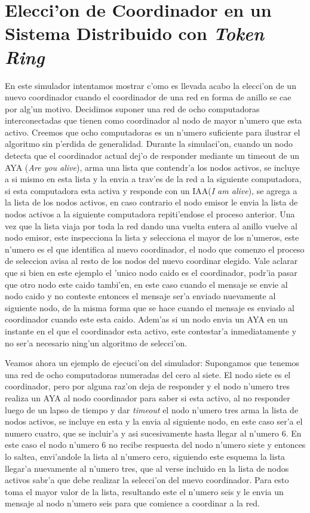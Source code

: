 \section{Elecci'on de Coordinador en un Sistema Distribuido con \emph{Token Ring}}
En este simulador intentamos mostrar c'omo es llevada acabo la elecci'on de un nuevo coordinador cuando el coordinador de una red en forma de anillo se cae por alg'un motivo.
Decidimos suponer una red de ocho computadoras interconectadas que tienen como coordinador al nodo de mayor n'umero que esta activo. Creemos que ocho computadoras es un n'umero suficiente para ilustrar el algoritmo sin p'erdida de generalidad.
Durante la simulaci'on, cuando un nodo detecta que el coordinador actual dej'o de responder mediante un timeout de un AYA (\emph{Are you alive}), arma una lista que contendr'a los nodos activos, se incluye a si mismo en esta lista y la envia a trav'es de la red a la siguiente computadora, si esta computadora esta activa y responde con un IAA(\emph{I am alive}), se agrega a la lista de los nodos activos, en caso contrario el nodo emisor le envia la lista de nodos activos a la siguiente computadora repiti'endose el proceso anterior. Una vez que la lista viaja por toda la red dando una vuelta entera al anillo vuelve al nodo emisor, este inspecciona la lista y selecciona el mayor de los n'umeros, este n'umero es el que identifica al nuevo coordinador, el nodo que comenzo el proceso de seleccion avisa al resto de los nodos del nuevo coordinar elegido. Vale aclarar que si bien en este ejemplo el 'unico nodo caido es el coordinador, podr'ia pasar que otro nodo este caido tambi'en, en este caso cuando el mensaje se envie al nodo caido y no conteste entonces el mensaje ser'a enviado nuevamente al siguiente nodo, de la misma forma que se hace cuando el mensaje es enviado al coordinador cuando este esta caido. Adem'as si un nodo envia un AYA en un instante en el que el coordinador esta activo, este contestar'a inmediatamente y no ser'a necesario ning'un algoritmo de selecci'on.

Veamos ahora un ejemplo de ejecuci'on del simulador:
Supongamos que tenemos una red de ocho computadoras numeradas del cero al siete. El nodo siete es el coordinador, pero por alguna raz'on deja de responder y el nodo n'umero tres realiza un AYA al nodo coordinador para saber si esta activo, al no responder luego de un lapso de tiempo y dar \emph{timeout} el nodo n'umero tres arma la lista de nodos activos, se incluye en esta y la envia al siguiente nodo, en este caso ser'a el numero cuatro, que se incluir'a y asi sucesivamente hasta llegar al n'umero 6. En este caso el nodo n'umero 6 no recibe respuesta del nodo n'umero siete y entonces lo saltea, envi'andole la lista al n'umero cero, siguiendo este esquema la lista llegar'a nuevamente al n'umero tres, que al verse incluido en la lista de nodos activos sabr'a que debe realizar la selecci'on del nuevo coordinador. Para esto toma el mayor valor de la lista, resultando este el n'umero seis y le envia un mensaje al nodo n'umero seis para que comience a coordinar a la red.


